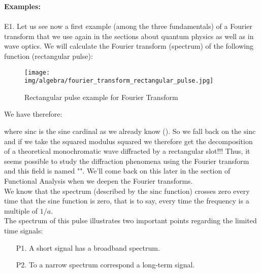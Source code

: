 	\begin{tcolorbox}[colframe=black,colback=white,sharp corners]
	\textbf{{\Large {}}Examples:}\\\\
	\label{fourier transform pulse square}E1. Let us see now a first example (among the three fundamentals) of a Fourier transform that we use again in the sections about quantum physics as well as in wave optics. We will calculate the Fourier transform (spectrum) of the following function (rectangular pulse):
	\begin{figure}[H]
		\centering
		\texttt{[image: img/algebra/fourier\_transform\_rectangular\_pulse.jpg]}
		\caption{Rectangular pulse example for Fourier Transform}
	\end{figure}
	We have therefore:
	
	where $\text{sinc}$ is the sine cardinal as we already know (). So we fall back on the $\text{sinc}$ and if we take the squared modulus squared we therefore get the decomposition of a theoretical monochromatic wave diffracted by a rectangular slot!!! Thus, it seems possible to study the diffraction phenomena using the Fourier transform and this field is named "". We'll come back on this later in the section of Functional Analysis when we deepen the Fourier transforms.\\
	
	We know that the spectrum (described by the $\text{sinc}$ function) crosses zero every time that the sine function is zero, that is to say, every time the frequency is a multiple of $1 / a$.\\
	
	The spectrum of this pulse illustrates two important points regarding the limited time signals:
	\begin{enumerate}
		\item[P1.] A short signal has a broadband spectrum.
		\item[P2.] To a narrow spectrum correspond a long-term signal.
	\end{enumerate}
	\end{tcolorbox}

